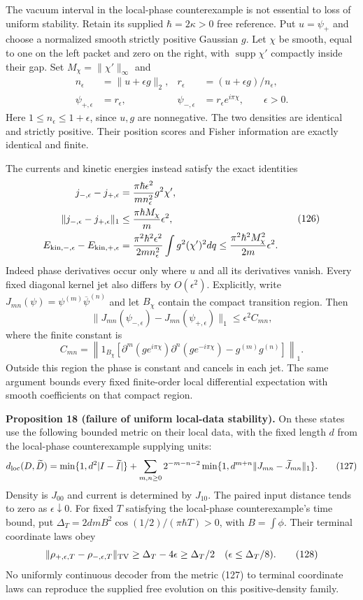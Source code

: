 \documentclass[11pt,a4paper]{article}
\begin{document}
The vacuum interval in the local-phase counterexample is not essential
to loss of uniform stability. Retain its supplied \(\hbar=2\kappa>0\)
free reference. Put \(u=\psi_+\) and choose a normalized smooth strictly
positive Gaussian \(g\). Let \(\chi\) be smooth, equal to one on the
left packet and zero on the right, with \(\operatorname{supp}\chi'\)
compactly inside their gap. Set \(M_\chi=\|\chi'\|_\infty\) and
\[\begin{aligned}
n_\epsilon&=\|u+\epsilon g\|_2,&
r_\epsilon&=(u+\epsilon g)/n_\epsilon,\\
\psi_{+,\epsilon}&=r_\epsilon,&
\psi_{-,\epsilon}&=r_\epsilon e^{i\pi\chi},\qquad\epsilon>0.
\end{aligned}\tag{125}\] Here \(1\le n_\epsilon\le1+\epsilon\), since
\(u,g\) are nonnegative. The two densities are identical and strictly
positive. Their position scores and Fisher information are exactly
identical and finite.

The currents and kinetic energies instead satisfy the exact identities
\[\begin{aligned}
j_{-,\epsilon}-j_{+,\epsilon}
 &=\frac{\pi\hbar\epsilon^2}{mn_\epsilon^2}g^2\chi',\\
\|j_{-,\epsilon}-j_{+,\epsilon}\|_1
 &\le\frac{\pi\hbar M_\chi}{m}\epsilon^2,\\
E_{{\rm kin},-,\epsilon}-E_{{\rm kin},+,\epsilon}
 &=\frac{\pi^2\hbar^2\epsilon^2}{2mn_\epsilon^2}
                  \int g^2(\chi')^2dq
 \le\frac{\pi^2\hbar^2M_\chi^2}{2m}\epsilon^2.
\end{aligned}\tag{126}\] Indeed phase derivatives occur only where \(u\)
and all its derivatives vanish. Every fixed diagonal kernel jet also
differs by \(O(\epsilon^2)\). Explicitly, write
\(J_{mn}(\psi)=\psi^{(m)}\overline{\psi}^{(n)}\) and let \(B_\chi\)
contain the compact transition region. Then
\[\|J_{mn}(\psi_{-,\epsilon})-J_{mn}(\psi_{+,\epsilon})\|_1
 \le\epsilon^2 C_{mn},\] where the finite constant is
\[C_{mn}=\left\|1_{B_\chi}\left[
 \partial^m(ge^{i\pi\chi})\partial^n(ge^{-i\pi\chi})
                 -g^{(m)}g^{(n)}\right]\right\|_1.\] Outside this region
the phase is constant and cancels in each jet. The same argument bounds
every fixed finite-order local differential expectation with smooth
coefficients on that compact region.

\textbf{Proposition 18 (failure of uniform local-data stability).} On
these states use the following bounded metric on their local data, with
the fixed length \(d\) from the local-phase counterexample supplying
units: \[d_{\rm loc}(D,\widetilde D)
=\min\{1,d^2|I-\widetilde I|\}
 +\sum_{m,n\ge0}2^{-m-n-2}
   \min\{1,d^{m+n}\|J_{mn}-\widetilde J_{mn}\|_1\}.
\tag{127}\] Density is \(J_{00}\) and current is determined by
\(J_{10}\). The paired input distance tends to zero as
\(\epsilon\downarrow0\). For fixed \(T\) satisfying the local-phase
counterexample's time bound, put
\(\Delta_T=2dmB^2\cos(1/2)/(\pi\hbar T)>0\), with \(B=\int\phi\). Their
terminal coordinate laws obey
\[\|\rho_{+,\epsilon,T}-\rho_{-,\epsilon,T}\|_{\rm TV}
 \ge\Delta_T-4\epsilon\ge\Delta_T/2
 \quad(\epsilon\le\Delta_T/8).\tag{128}\] No uniformly continuous
decoder from the metric (127) to terminal coordinate laws can reproduce
the supplied free evolution on this positive-density family.
\end{document}
